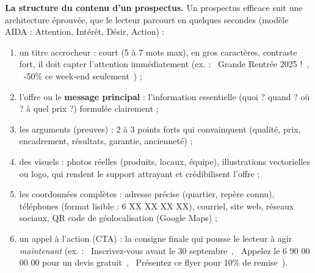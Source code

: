\documentclass[11pt]{article}
\newcommand{\cle}[1]{{\popxbold\color{popdark}#1}}
\begin{document}
\textbf{La structure du contenu d'un prospectus.} Un prospectus efficace suit une architecture éprouvée, que le lecteur parcourt en quelques secondes (modèle AIDA : Attention, Intérêt, Désir, Action) :

\begin{enumerate}
\item un \cle{titre accrocheur} : court (5 à 7 mots max), en gros caractères, contraste fort, il doit capter l'attention immédiatement (ex. : \og~Grande Rentrée 2025 !~\fg{}, \og~-50\% ce week-end seulement~\!\fg{}) ;
\item l'\cle{offre} ou le \textbf{message principal} : l'information essentielle (quoi ? quand ? où ? à quel prix ?) formulée clairement ;
\item les \cle{arguments} (preuves) : 2 à 3 points forts qui convainquent (qualité, prix, encadrement, résultats, garantie, ancienneté) ;
\item des \cle{visuels} : photos réelles (produits, locaux, équipe), illustrations vectorielles ou logo, qui rendent le support attrayant et crédibilisent l'offre ;
\item les \cle{coordonnées} complètes : adresse précise (quartier, repère connu), téléphones (format lisible : 6 XX XX XX XX), courriel, site web, réseaux sociaux, QR code de géolocalisation (Google Maps) ;
\item un \cle{appel à l'action} (CTA) : la consigne finale qui pousse le lecteur à agir \emph{maintenant} (ex. : \og~Inscrivez-vous avant le 30 septembre~\!\fg{}, \og~Appelez le 6 90 00 00 00 pour un devis gratuit~\!\fg{}, \og~Présentez ce flyer pour 10\% de remise~\!\fg{}).
\end{enumerate}
\end{document}
